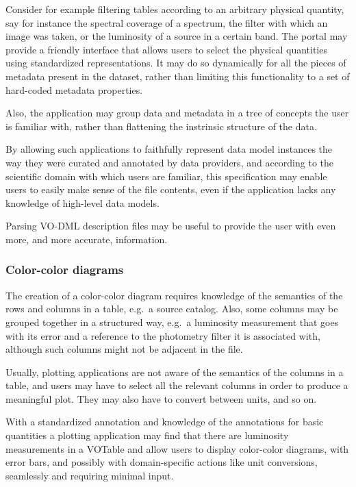 \documentclass[11pt,a4paper]{ivoa}
\begin{document}
Consider for example filtering tables according to an arbitrary physical
quantity, say for instance the spectral coverage of a spectrum, the
filter with which an image was taken, or the luminosity of a source in a
certain band. The portal may provide a friendly interface that allows
users to select the physical quantities using standardized
representations. It may do so dynamically for all the pieces of metadata
present in the dataset, rather than limiting this functionality to a set
of hard-coded metadata properties.

Also, the application may group data and metadata in a tree of concepts
the user is familiar with, rather than flattening the instrinsic
structure of the data.

By allowing such applications to faithfully represent data model
instances the way they were curated and annotated by data providers, and
according to the scientific domain with which users are familiar, this
specification may enable users to easily make sense of the file
contents, even if the application lacks any knowledge of high-level data
models.

Parsing VO-DML description files may be useful to provide the user with
even more, and more accurate, information.

\subsubsection{Color-color diagrams}\label{color-color-diagrams}

The creation of a color-color diagram requires knowledge of the
semantics of the rows and columns in a table, e.g.~a source catalog.
Also, some columns may be grouped together in a structured way, e.g.~a
luminosity measurement that goes with its error and a reference to the
photometry filter it is associated with, although such columns might not
be adjacent in the file.

Usually, plotting applications are not aware of the semantics of the
columns in a table, and users may have to select all the relevant
columns in order to produce a meaningful plot. They may also have to
convert between units, and so on.

With a standardized annotation and knowledge of the annotations for
basic quantities a plotting application may find that there are
luminosity measurements in a VOTable and allow users to display
color-color diagrams, with error bars, and possibly with domain-specific
actions like unit conversions, seamlessly and requiring minimal input.
\end{document}
